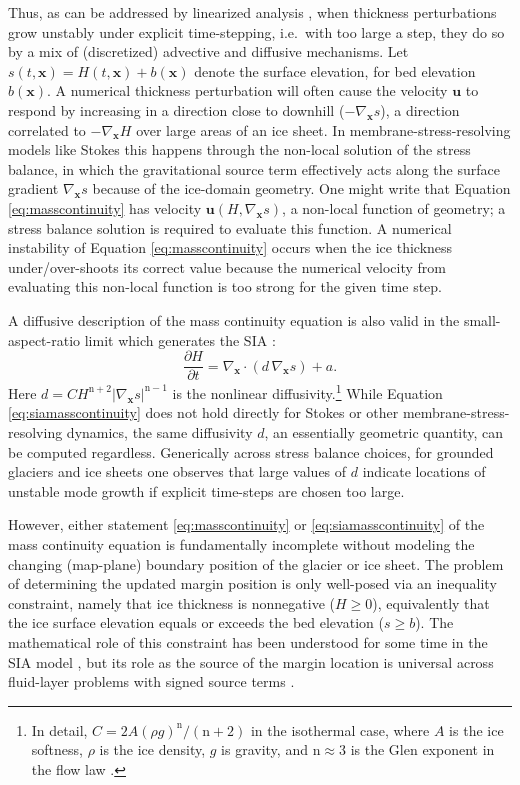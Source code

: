 \documentclass[review,letterpaper]{igs}
\newcommand\bu{\mathbf{u}}
\newcommand\bx{\mathbf{x}}
\newcommand{\Divx}{\nabla_\bx \cdot}
\newcommand{\gradx}{\nabla_\bx}
\begin{document}
Thus, as can be addressed by linearized analysis \citep{Robinsonetal2022}, when thickness perturbations grow unstably under explicit time-stepping, i.e.~with too large a step, they do so by a mix of (discretized) advective and diffusive mechanisms.  Let $s(t,\bx)=H(t,\bx)+b(\bx)$ denote the surface elevation, for bed elevation $b(\bx)$.  A numerical thickness perturbation will often cause the velocity $\bu$ to respond by increasing in a direction close to downhill ($-\gradx s$), a direction correlated to $-\gradx H$ over large areas of an ice sheet.  In membrane-stress-resolving models like Stokes this happens through the non-local solution of the stress balance, in which the gravitational source term effectively acts along the surface gradient $\gradx s$ because of the ice-domain geometry.  One might write that Equation \eqref{eq:masscontinuity} has velocity $\bu(H,\gradx s)$, a non-local function of geometry; a stress balance solution is required to evaluate this function.  A numerical instability of Equation \eqref{eq:masscontinuity} occurs when the ice thickness under/over-shoots its correct value because the numerical velocity from evaluating this non-local function is too strong for the given time step.

\newcommand{\nn}{\text{n}}
A diffusive description of the mass continuity equation is also valid in the small-aspect-ratio limit which generates the SIA \citep{SchoofHewitt2013}:
\begin{equation}
\frac{\partial H}{\partial t} = \Divx \left(d\, \gradx s \right) + a. \label{eq:siamasscontinuity}
\end{equation}
Here $d = C H^{\nn+2} |\gradx s|^{\nn-1}$ is the nonlinear diffusivity.\footnote{In detail, $C = 2 A (\rho g)^\nn/(\nn+2)$ in the isothermal case, where $A$ is the ice softness, $\rho$ is the ice density, $g$ is gravity, and $\nn\approx 3$ is the Glen exponent in the flow law \citep{GreveBlatter2009}.}  While Equation \eqref{eq:siamasscontinuity} does not hold directly for Stokes or other membrane-stress-resolving dynamics, the same diffusivity $d$, an essentially geometric quantity, can be computed regardless.  Generically across stress balance choices, for grounded glaciers and ice sheets one observes that large values of $d$ indicate locations of unstable mode growth if explicit time-steps are chosen too large.

However, either statement \eqref{eq:masscontinuity} or \eqref{eq:siamasscontinuity} of the mass continuity equation is fundamentally incomplete without modeling the changing (map-plane) boundary position of the glacier or ice sheet.  The problem of determining the updated margin position is only well-posed via an inequality constraint, namely that ice thickness is nonnegative ($H\ge 0$), equivalently that the ice surface elevation equals or exceeds the bed elevation ($s \ge b$).  The mathematical role of this constraint has been understood for some time in the SIA model \citep{Calvoetal2002,JouvetBueler2012,SchoofHewitt2013}, but its role as the source of the margin location is universal across fluid-layer problems with signed source terms \citep{Bueler2021conservation}.
\end{document}
